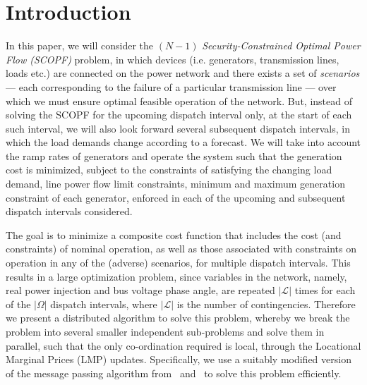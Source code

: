 \documentclass[preprint,12pt,3p]{elsarticle}
\begin{document}
	\section{Introduction}
	\noindent In this paper, we will consider the $(N-1)$ \emph{Security-Constrained Optimal Power Flow (SCOPF)} problem, in which devices (i.e. generators, transmission lines, loads etc.) are connected on the power network and there exists a set of \emph{scenarios} --- each corresponding to the failure of a particular transmission line --- over which we must ensure optimal feasible operation of the network. But, instead of solving the SCOPF for the upcoming dispatch interval only, at the start of each such interval, we will also look forward several subsequent dispatch intervals, in which the load demands change according to a forecast. We will take into account the ramp rates of generators and operate the system such that the generation cost is minimized, subject to the constraints of satisfying the changing load demand, line power flow limit constraints, minimum and maximum generation constraint of each generator, enforced in each of the upcoming and subsequent dispatch intervals considered.
	
	The goal is to minimize a composite cost function that includes the cost (and constraints) of nominal operation, as well as those associated with constraints on operation in any of the (adverse) scenarios, for multiple dispatch intervals. This results in a large optimization problem, since variables in the network, namely, real power injection and bus voltage phase angle, are repeated $|\mathcal{L}|$ times for each of the $|\Omega|$ dispatch intervals, where $|\mathcal{L}|$ is the number of contingencies. Therefore we present a distributed algorithm to solve this problem, whereby we break the problem into several smaller independent sub-problems and solve them in parallel, such that the only co-ordination required is local, through the Locational Marginal Prices (LMP) updates. Specifically, we use a suitably modified version of the message passing algorithm from~\cite{KC:13} and~\cite{CK:14} to solve this problem efficiently.
	
\end{document}
